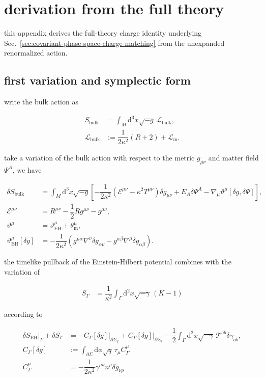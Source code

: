 \section{derivation from the full theory}\label{app:full-theory-derivation}

this appendix derives the full-theory charge identity underlying Sec.~\ref{sec:covariant-phase-space-charge-matching} from the unexpanded renormalized action.

\subsection{first variation and symplectic form}

write the bulk action as

\begin{align}
S_{\mathrm{bulk}} & =\int _{M}\mathrm{d}^{3}x\sqrt{-g}\,\mathcal{L}_{\mathrm{bulk}}, \\
\mathcal{L}_{\mathrm{bulk}}&:=\dfrac{1}{2\kappa ^2}(R+2)+\mathcal{L}_{\mathrm{m}}.
\end{align}

take a variation of the bulk action with respect to the metric $\displaystyle{g_{\mu \nu}}$ and matter field $\displaystyle{\Psi^{A}}$, we have

\begin{align}
\delta S_{\mathrm{bulk}} & =\int _{M}\mathrm{d}^{3}x\sqrt{-g}\left[-\dfrac{1}{2\kappa ^2}\left(\mathcal{E}^{\mu \nu}-\kappa ^2T^{\mu \nu}\right)\delta g_{\mu \nu}+E_{A}\delta\Psi ^A-\nabla _{\mu}\vartheta ^{\mu}[\delta g,\delta\Psi]\right], \\
\mathcal{E}^{\mu \nu} & =R^{\mu \nu}-\dfrac{1}{2}Rg^{\mu \nu}-g^{\mu \nu}, \\
\vartheta ^{\mu} & =\vartheta _{\mathrm{EH}}^{\mu}+\theta _{\mathrm{m}}^{\mu}, \\
\vartheta _{\mathrm{EH}}^{\mu}[\delta g] & =-\dfrac{1}{2\kappa ^2}\left(g^{\mu\alpha}\nabla ^{\nu}\delta g_{\alpha\nu}-g^{\alpha\beta}\nabla ^{\mu}\delta g_{\alpha\beta}\right).
\end{align}

the timelike pullback of the Einstein-Hilbert potential combines with the variation of

\begin{align}
S_{\Gamma} & =\dfrac{1}{\kappa ^2}\int _{\Gamma}\mathrm{d}^{2}x\sqrt{-\gamma}\,(K-1)
\end{align}

according to

\begin{align}
\left.\delta S_{\mathrm{EH}}\right|_{\Gamma}+\delta S_{\Gamma} & =-C_{\Gamma}[\delta g]\big|_{\partial\Sigma _f}+C_{\Gamma}[\delta g]\big|_{\partial\Sigma _i}-\dfrac{1}{2}\int _{\Gamma}\mathrm{d}^{2}x\sqrt{-\gamma}\,\mathcal{T}^{ab}\delta\gamma _{ab}, \\
C_{\Gamma}[\delta g] & :=\int _{\partial\Sigma}\mathrm{d}\phi\sqrt{q}\,\tau _{\mu}C_{\Gamma}^{\mu} \\
C_{\Gamma}^{\mu} & =-\dfrac{1}{2\kappa ^{2}} \gamma ^{\mu \nu}n^{\rho}\delta g_{\nu \rho}
\end{align}

